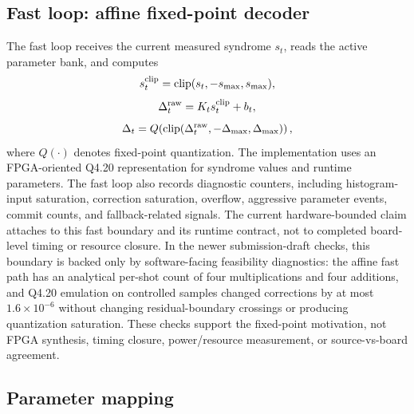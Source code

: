 \documentclass[11pt]{article}
\begin{document}
\subsection{Fast loop: affine fixed-point decoder}

The fast loop receives the current measured syndrome \(s_t\), reads the active
parameter bank, and computes
\begin{equation}
    s_t^{\rm clip}={\rm clip}(s_t,-s_{\max},s_{\max}),
\end{equation}
\begin{equation}
    \Delta_t^{\rm raw}=K_t s_t^{\rm clip}+b_t,
\end{equation}
\begin{equation}
    \Delta_t=Q\!\left({\rm clip}(\Delta_t^{\rm raw},
    -\Delta_{\max},\Delta_{\max})\right),
\end{equation}
where \(Q(\cdot)\) denotes fixed-point quantization.  The implementation uses
an FPGA-oriented Q4.20 representation for syndrome values and runtime
parameters.  The fast loop also records diagnostic counters, including
histogram-input saturation, correction saturation, overflow, aggressive
parameter events, commit counts, and fallback-related signals.
The current hardware-bounded claim attaches to this fast boundary and its
runtime contract, not to completed board-level timing or resource closure.
In the newer submission-draft checks, this boundary is backed only by
software-facing feasibility diagnostics: the affine fast path has an
analytical per-shot count of four multiplications and four additions, and Q4.20
emulation on controlled samples changed corrections by at most
\(1.6\times10^{-6}\) without changing residual-boundary crossings or producing
quantization saturation.  These checks support the fixed-point motivation, not
FPGA synthesis, timing closure, power/resource measurement, or source-vs-board
agreement.

\subsection{Parameter mapping}
\end{document}
